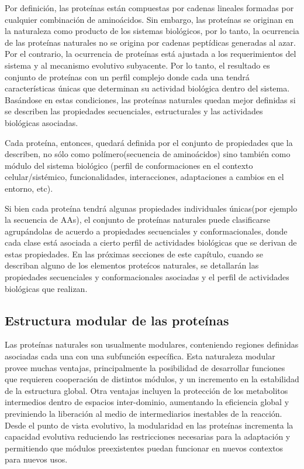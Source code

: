 Por definición, las proteínas están compuestas por cadenas lineales formadas por cualquier combinación de aminoácidos.
Sin embargo, las proteínas se originan en la naturaleza como producto de los sistemas biológicos, por lo tanto, 
la ocurrencia de las proteínas naturales no se origina por cadenas peptídicas generadas al azar. 
Por el contrario, la ocurrencia de proteínas está ajustada a los requerimientos del sistema y al mecanismo evolutivo subyacente. 
Por lo tanto, el resultado es conjunto de proteínas con un perfil complejo donde cada una tendrá características únicas que determinan su actividad biológica dentro del sistema.
Basándose en estas condiciones, las proteínas naturales quedan mejor definidas si se describen las propiedades secuenciales, estructurales y las actividades biológicas asociadas. 

Cada proteína, entonces, quedará definida por el conjunto de propiedades que la describen, no sólo como polímero(secuencia de aminoácidos) 
sino también como módulo del sistema biológico (perfil de conformaciones en el contexto celular/sistémico, funcionalidades, interacciones, adaptaciones a cambios en el entorno, etc). 

Si bien cada proteína tendrá algunas propiedades individuales únicas(por ejemplo la secuencia de AAs), 
el conjunto de proteínas naturales puede clasificarse 
agrupándolas de acuerdo a propiedades secuenciales y conformacionales, donde cada clase está asociada a cierto perfil de actividades biológicas que se derivan de estas propiedades.
En las próximas secciones de este capítulo, cuando se describan alguno de los elementos proteícos naturales, 
se detallarán las propiedades secuenciales y conformacionales asociadas y el perfil de actividades biológicas que realizan.









\subsection{Estructura modular de las proteínas}

Las proteínas naturales son usualmente modulares, conteniendo regiones definidas asociadas cada una con una subfunción específica.
Esta naturaleza modular provee muchas ventajas, principalmente la posibilidad de desarrollar funciones que requieren cooperación de distintos módulos, y un incremento en la estabilidad de la estructura global.
Otra ventajas incluyen la protección de los metabolitos intermedios dentro de espacios inter-dominio, aumentando la eficiencia global y previniendo la liberación al medio de intermediarios inestables de la reacción.  
Desde el punto de vista evolutivo, la modularidad en las proteínas incrementa la capacidad evolutiva reduciendo las restricciones necesarias 
para la adaptación y permitiendo que módulos preexistentes puedan funcionar en nuevos contextos para nuevos usos.

